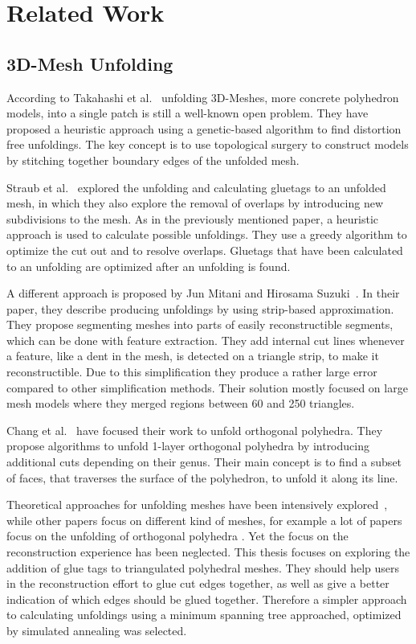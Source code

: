 \documentclass[draft,final]{vutinfth} %
\begin{document}
\chapter{Related Work}
\label{chap:relatedwork}

\section{3D-Mesh Unfolding}
According to Takahashi et al.~\cite{takahashi2011optimized} unfolding 3D-Meshes, more concrete polyhedron models, into a single patch is still a well-known open problem. They have proposed a heuristic approach using a genetic-based algorithm to find distortion free unfoldings. The key concept is to use topological surgery to construct models by stitching together boundary edges of the unfolded mesh.

Straub et al.~\cite{straubcreating} explored the unfolding and calculating gluetags to an unfolded mesh, in which they also explore the removal of overlaps by introducing new subdivisions to the mesh. As in the previously mentioned paper, a heuristic approach is used to calculate possible unfoldings. They use a greedy algorithm to optimize the cut out and to resolve overlaps. Gluetags that have been calculated to an unfolding are optimized after an unfolding is found.

A different approach is proposed by Jun Mitani and Hirosama Suzuki~\cite{mitani2004making}. In their paper, they describe producing unfoldings by using strip-based approximation. They propose segmenting meshes into parts of easily reconstructible segments, which can be done with feature extraction. They add internal cut lines whenever a feature, like a dent in the mesh, is detected on a triangle strip, to make it reconstructible. Due to this simplification they produce a rather large error compared to other simplification methods. Their solution mostly focused on large mesh models where they merged regions between 60 and 250 triangles.

Chang et al.~\cite{xi2016learning} have focused their work to unfold orthogonal polyhedra. They propose algorithms to unfold 1-layer orthogonal polyhedra by introducing additional cuts depending on their genus. Their main concept is to find a subset of faces, that traverses the surface of the polyhedron, to unfold it along its line. 

Theoretical approaches for unfolding meshes have been intensively explored~\cite{shephard1975convex}, while other papers focus on different kind of meshes, for example a lot of papers focus on the unfolding of orthogonal polyhedra \cite{xi2016learning}\cite{damian2007epsilon}\cite{damian2014unfolding}. Yet the focus on the reconstruction experience has been neglected. This thesis focuses on exploring the addition of glue tags to triangulated polyhedral meshes. They should help users in the reconstruction effort to glue cut edges together, as well as give a better indication of which edges should be glued together. Therefore a simpler approach to calculating unfoldings using a minimum spanning tree approached, optimized by simulated annealing was selected.
\end{document}
